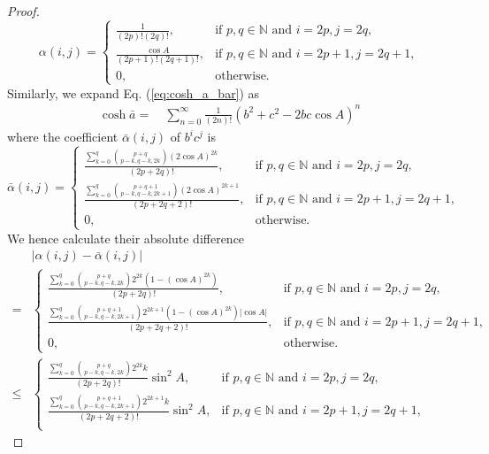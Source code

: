 \begin{proof}
\begin{equation}
	\alpha(i,j) = \left\{\begin{array}{rl}
	\frac{1}{(2p)!(2q)!}, & \text{if~} p,q\in\mathbb{N} \text{~and~} i=2p,j=2q, \\
	\frac{\cos A}{(2p+1)!(2q+1)!}, & \text{if~} p,q\in\mathbb{N} \text{~and~} i=2p+1,j=2q+1, \\
	0, & \text{otherwise.}
	\end{array}\right.
	\end{equation}
	Similarly, we expand Eq. (\ref{eq:cosh_a_bar}) as
	\begin{align*}
	\cosh\bar{a} = &~ \sum_{n=0}^{\infty} \frac{1}{(2n)!} \left(b^2+c^2-2bc\cos A\right)^n
	\end{align*}
	where the coefficient $\bar{\alpha}(i,j)$ of $b^ic^j$ is
	\begin{equation}
	\bar{\alpha}(i,j) = \left\{\begin{array}{rl}
	\frac{\sum_{k=0}^{q} \binom{p+q}{p-k, q-k, 2k}(2\cos A)^{2k}}{(2p+2q)!} , & \text{if~} p,q\in\mathbb{N} \text{~and~} i=2p,j=2q, \\
	\frac{\sum_{k=0}^{q} \binom{p+q+1}{p-k, q-k, 2k+1}(2\cos A)^{2k+1}}{(2p+2q+2)!} , & \text{if~} p,q\in\mathbb{N} \text{~and~} i=2p+1,j=2q+1, \\
	0, & \text{otherwise.}
	\end{array}\right.
	\end{equation}
	We hence calculate their absolute difference
	\begin{align*}
	& |\alpha(i,j) - \bar{\alpha}(i,j)|  \\ 
	= & \left\{\begin{array}{rl}
	\frac{\sum_{k=0}^{q} \binom{p+q}{p-k, q-k, 2k}2^{2k}\left(1-(\cos A)^{2k}\right)}{(2p+2q)!} , & \text{if~} p,q\in\mathbb{N} \text{~and~} i=2p,j=2q, \\
	\frac{\sum_{k=0}^{q} \binom{p+q+1}{p-k, q-k, 2k+1}2^{2k+1}\left(1-(\cos A)^{2k}\right)|\cos A|}{(2p+2q+2)!} , & \text{if~} p,q\in\mathbb{N} \text{~and~} i=2p+1,j=2q+1, \\
	0, & \text{otherwise.}
	\end{array}\right. \\
	\le & \left\{\begin{array}{rl}
	\frac{\sum_{k=0}^{q} \binom{p+q}{p-k, q-k, 2k}2^{2k}k}{(2p+2q)!} \sin^2 A, & \text{if~} p,q\in\mathbb{N} \text{~and~} i=2p,j=2q, \\
	\frac{\sum_{k=0}^{q} \binom{p+q+1}{p-k, q-k, 2k+1}2^{2k+1}k}{(2p+2q+2)!} \sin^2 A, & \text{if~} p,q\in\mathbb{N} \text{~and~} i=2p+1,j=2q+1, \\

\end{array}
\end{align*}
\end{proof}
